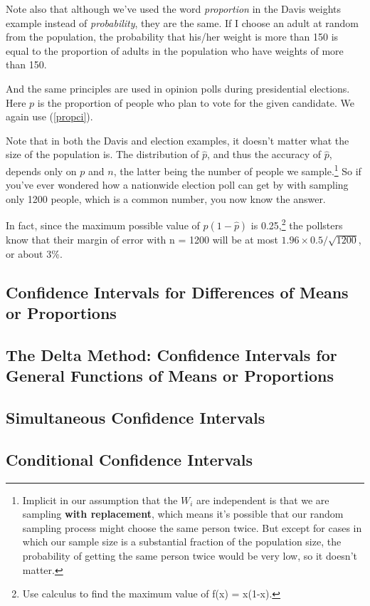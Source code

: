 Note also that although we've used the word {\it proportion} in the
Davis weights example instead of {\it probability}, they are the same.
If I choose an adult at random from the population, the probability that
his/her weight is more than 150 is equal to the proportion of adults in
the population who have weights of more than 150.

And the same principles are used in opinion polls during presidential
elections.  Here $p$ is the proportion of people who plan to vote for
the given candidate.  We again use (\ref{propci}).

Note that in both the Davis and election examples, it doesn't matter
what the size of the population is.  The distribution of $\hat{p}$, and
thus the accuracy of $\hat{p}$, depends only on $p$ and $n$, the latter
being the number of people we sample.\footnote{Implicit in our
assumption that the $W_i$ are independent is that we are sampling {\bf
with replacement}, which means it's possible that our random sampling
process might choose the same person twice.  But except for cases in
which our sample size is a substantial fraction of the population size,
the probability of getting the same person twice would be very low, so
it doesn't matter.} So if you've ever wondered how a nationwide election
poll can get by with sampling only 1200 people, which is a common
number, you now know the answer.

In fact, since the maximum possible value of $\hat{p} (1-\hat{p})$ is
0.25,\footnote{Use calculus to find the maximum value of f(x) = x(1-x).}
the pollsters know that their margin of error with n = 1200 will be at
most $1.96 \times 0.5/\sqrt{1200}$, or about 3\%. 

\subsection{Confidence Intervals for Differences of Means or Proportions}

\subsection{The Delta Method:  Confidence Intervals for General
Functions of Means or Proportions}

\subsection{Simultaneous Confidence Intervals} 

\subsection{Conditional Confidence Intervals}

